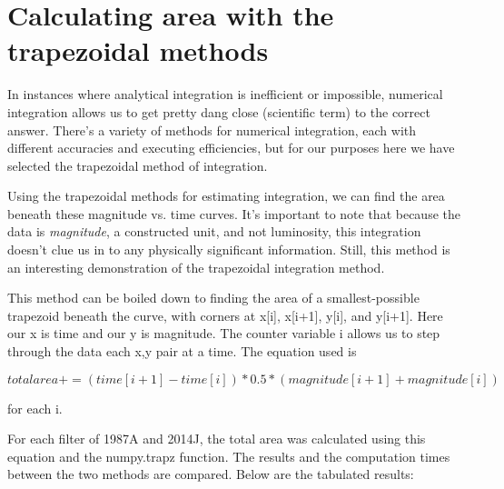 \section{Calculating area with the trapezoidal methods}

In instances where analytical integration is inefficient or impossible, numerical integration allows us to get pretty dang close (scientific term) to the correct answer. There's a variety of methods for numerical integration, each with different accuracies and executing efficiencies, but for our purposes here we have selected the trapezoidal method of integration. 

Using the trapezoidal methods for estimating integration, we can find the area beneath these magnitude vs. time curves. It's important to note that because the data is \textit{magnitude}, a constructed unit, and not luminosity, this integration doesn't clue us in to any physically significant information. Still, this method is an interesting demonstration of the trapezoidal integration method.

This method can be boiled down to finding the area of a smallest-possible trapezoid beneath the curve, with corners at x[i], x[i+1], y[i], and y[i+1]. Here our x is time and our y is magnitude. The counter variable i allows us to step through the data each x,y pair at a time. The equation used is 

\begin{equation}
	\label{fit_eq}
	total area += (time[i+1] - time[i])*0.5*(magnitude[i+1]+magnitude[i])
\end{equation}

for each i.

For each filter of 1987A and 2014J, the total area was calculated using this equation and the numpy.trapz function. The results and the computation times between the two methods are compared. Below are the tabulated results:

